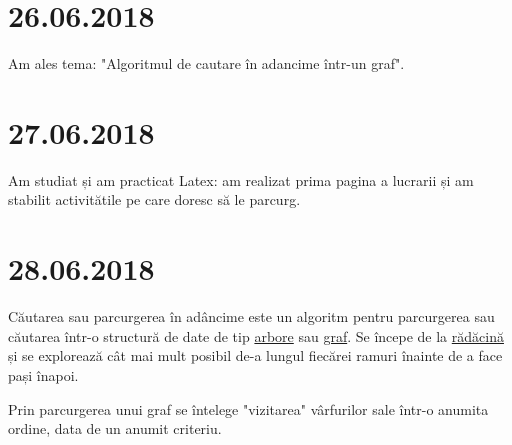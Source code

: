 \documentclass{report}
\begin{document}
\chapter{26.06.2018}

Am ales tema: "Algoritmul de cautare în adancime într-un graf".

\chapter{27.06.2018}

Am studiat și am practicat Latex: am realizat prima pagina a lucrarii și am stabilit activitătile pe care doresc să le parcurg.

\chapter{28.06.2018}

Căutarea sau parcurgerea în adâncime este un algoritm pentru parcurgerea sau căutarea într-o structură de date de tip \underline{arbore} sau \underline{graf}. Se începe de la \underline{rădăcină} și se explorează cât mai mult posibil de-a lungul fiecărei ramuri înainte de a face pași înapoi.

Prin parcurgerea unui graf se întelege "vizitarea" vârfurilor sale într-o anumita ordine, data de un anumit criteriu.
\end{document}
